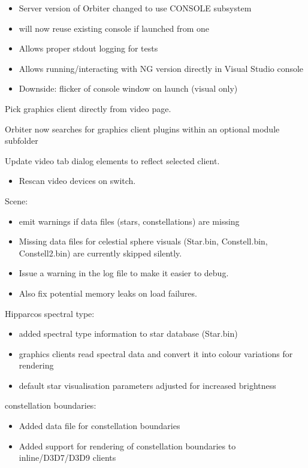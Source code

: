 \documentclass[Orbiter User Manual.tex]{subfiles}
\begin{document}
\begin{itemize}
\begin{sloppypar}
\begin{itemize}
		\item Server version of Orbiter changed to use CONSOLE subsystem
		\item will now reuse existing console if launched from one
		\item Allows proper stdout logging for tests
		\item Allows running/interacting with NG version directly in Visual Studio console
		\item Downside: flicker of console window on launch (visual only)
	\end{itemize}
	\item Pick graphics client directly from video page.
	\item Orbiter now searches for graphics client plugins within an optional module subfolder
	\item Update video tab dialog elements to reflect selected client.
	\begin{itemize}
		\item Rescan video devices on switch.
	\end{itemize}
	\item Scene:
	\begin{itemize}
		\item emit warnings if data files (stars, constellations) are missing
		\item Missing data files for celestial sphere visuals (Star.bin, Constell.bin, Constell2.bin) are currently skipped silently.
		\item Issue a warning in the log file to make it easier to debug.
		\item Also fix potential memory leaks on load failures.
	\end{itemize}
	\item Hipparcos spectral type:
	\begin{itemize}
		\item added spectral type information to star database (Star.bin)
		\item graphics clients read spectral data and convert it into colour variations for rendering
		\item default star visualisation parameters adjusted for increased brightness
	\end{itemize}
	\item constellation boundaries:
	\begin{itemize}
		\item Added data file for constellation boundaries
		\item Added support for rendering of constellation boundaries to inline/D3D7/D3D9 clients

\end{itemize}
\end{sloppypar}
\end{itemize}
\end{document}
